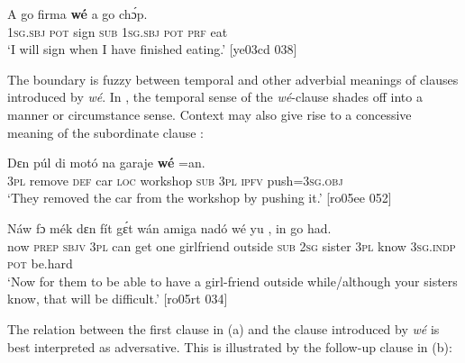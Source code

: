 \ea%
    \label{ex:key:1462}
    \gll A    go  firma  \textbf{wé}  a  go    chɔ́p.\\
\textsc{1sg.sbj}  \textsc{pot}  sign  \textsc{sub}  \textsc{1sg.sbj}  \textsc{pot}  \textsc{prf}  eat\\

\glt ‘I will sign when I have finished eating.’ [ye03cd 038]
\z

The boundary is fuzzy between temporal and other adverbial meanings of clauses introduced by \textit{wé}. In , the temporal sense of the \textit{wé}{}-clause shades off into a manner or circumstance sense. Context may also give rise to a concessive meaning of the subordinate clause : 


\ea%
    \label{ex:key:1463}
    \gll Dɛn  púl    di  motó  na  garaje    \textbf{wé}      =an.\\
\textsc{3pl}  remove  \textsc{def}  car    \textsc{loc}  workshop  \textsc{sub}  \textsc{3pl}  \textsc{ipfv}  push=\textsc{3sg.obj}\\

\glt ‘They removed the car from the workshop by pushing it.’ [ro05ee 052]
\z


\ea%
    \label{ex:key:1464}
    \gll Náw    fɔ  mék    dɛn  fít  gɛ́t  wán    amiga    nadó  wé  yu
    ,  in    go  had.\\
now    \textsc{prep}  \textsc{sbjv}    \textsc{3pl}  can  get  one    girlfriend  outside  \textsc{sub}  \textsc{2sg}
sister  \textsc{3pl}  know  \textsc{3sg.indp}  \textsc{pot}  be.hard\\

\glt ‘Now for them to be able to have a girl-friend outside while/although 
your sisters know, that will be difficult.’ [ro05rt 034]
\z

The relation between the first clause in (a) and the clause introduced by \textit{wé} is best interpreted as adversative. This is illustrated by the follow-up clause in (b):


\ea%
    \label{ex:key:1465}
\z\z

